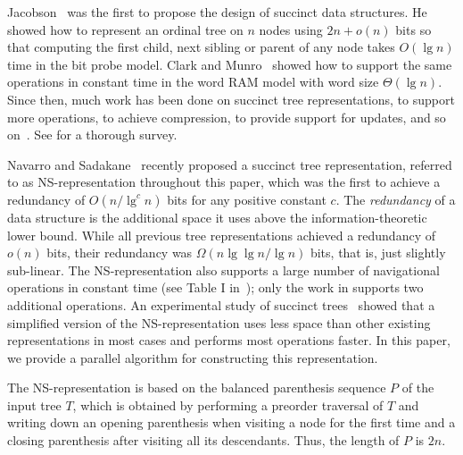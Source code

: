 Jacobson~\cite{j1989} was the first to propose the design of succinct data
structures.  He showed how to represent an ordinal tree on $n$ nodes
using $2n+o(n)$ bits so that computing the first child, next sibling
or parent of any node takes $O(\lg n)$ time in the bit probe
model.  Clark and Munro~\cite{cm1996} showed how to support the same
operations in constant time in the word RAM model with word size
$\Theta(\lg n)$.  Since then, much work has been done on succinct tree
representations, to support more operations, to achieve compression,
to provide support for updates, and so
on~\cite{mr1997,bdmr1999,grr2004,jss2007,ly2008,hms2012,fm2014,Navarro:2014:FFS:2620785.2601073}.
See \cite{rr2013} for a thorough survey.

Navarro and Sadakane~\cite{Navarro:2014:FFS:2620785.2601073} recently
proposed a succinct tree representation, referred to as
NS-representation throughout this paper, which was the first to
achieve a redundancy of $O(n/\lg^c n)$ bits for any positive constant
$c$.  The \emph{redundancy} of a data structure is the additional
space it uses above the information-theoretic lower bound.  While all
previous tree representations achieved a redundancy of $o(n)$ bits,
their redundancy was $\Omega(n \lg\lg n / \lg n)$ bits, that is, just
slightly sub-linear.  The NS-representation also supports a large
number of navigational operations in constant time (see
Table I in~\cite{Navarro:2014:FFS:2620785.2601073});
only the work in \cite{hms2012,fm2014} supports two additional operations.
An experimental study of succinct trees~\cite{ACNSalenex10} showed that a
simplified version of the NS-representation uses less space than other
existing representations in most cases and performs most operations
faster.  In this paper, we provide a parallel algorithm for
constructing this representation.

The NS-representation is based on the balanced parenthesis sequence
$P$ of the input tree $T$, which is obtained by performing a preorder
traversal of $T$ and writing down an opening parenthesis when visiting a node
for the first time and a closing parenthesis after visiting all
its descendants.  Thus, the length of $P$ is $2n$.

